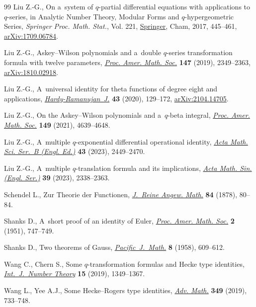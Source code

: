 \begin{thebibliography}{99}
Liu Z.-G., On a~system of {$q$}-partial differential equations with applications
 to {$q$}-series, in Analytic Number Theory, Modular Forms and
 {$q$}-hypergeometric Series, \textit{Springer Proc. Math. Stat.}, Vol. 221,
 \href{https://doi.org/10.1007/978-3-319-68376-8_2}{Springer}, Cham, 2017, 445--461, \href{https://arxiv.org/abs/1709.06784}{arXiv:1709.06784}.

Liu Z.-G., {A}skey--{W}ilson polynomials and a~double {$q$}-series
 transformation formula with twelve parameters, \href{https://doi.org/10.1090/proc/14411}{\textit{Proc. Amer. Math.
 Soc.}} \textbf{147} (2019), 2349--2363, \href{https://arxiv.org/abs/1810.02918}{arXiv:1810.02918}.

Liu Z.-G., A~universal identity for theta functions of degree eight and
 applications, \href{https://doi.org/10.46298/hrj.2021.7432}{\textit{Hardy-Ramanujan~J.}} \textbf{43} (2020), 129--172,
 \href{https://arxiv.org/abs/2104.14705}{arXiv:2104.14705}.

Liu Z.-G., On the {A}skey--{W}ilson polynomials and a~{$q$}-beta integral,
 \href{https://doi.org/10.1090/proc/15584}{\textit{Proc. Amer. Math. Soc.}} \textbf{149} (2021), 4639--4648.

Liu Z.-G., A~multiple {$q$}-exponential differential operational identity,
 \href{https://doi.org/10.1007/s10473-023-0608-3}{\textit{Acta Math. Sci. Ser.~B (Engl. Ed.)}} \textbf{43} (2023), 2449--2470.

Liu Z.-G., A~multiple {$q$}-translation formula and its implications,
 \href{https://doi.org/10.1007/s10114-023-2237-0}{\textit{Acta Math. Sin. (Engl. Ser.)}} \textbf{39} (2023), 2338--2363.

Schendel L., Zur {T}heorie der {F}unctionen, \href{https://doi.org/10.1515/crelle-1878-18788406}{\textit{J.~Reine Angew. Math.}}
 \textbf{84} (1878), 80--84.

Shanks D., A~short proof of an identity of {E}uler, \href{https://doi.org/10.2307/2032076}{\textit{Proc. Amer. Math.
 Soc.}} \textbf{2} (1951), 747--749.

Shanks D., Two theorems of {G}auss, \href{https://doi.org/10.2140/pjm.1958.8.609}{\textit{Pacific~J.~Math.}} \textbf{8}
 (1958), 609--612.

Wang C., Chern S., Some {$q$}-transformation formulas and {H}ecke type
 identities, \href{https://doi.org/10.1142/S1793042119500751}{\textit{Int.~J.~Number Theory}} \textbf{15} (2019), 1349--1367.

Wang L., Yee A.J., Some {H}ecke--{R}ogers type identities, \href{https://doi.org/10.1016/j.aim.2019.04.015}{\textit{Adv. Math.}}
 \textbf{349} (2019), 733--748.

\end{thebibliography}
